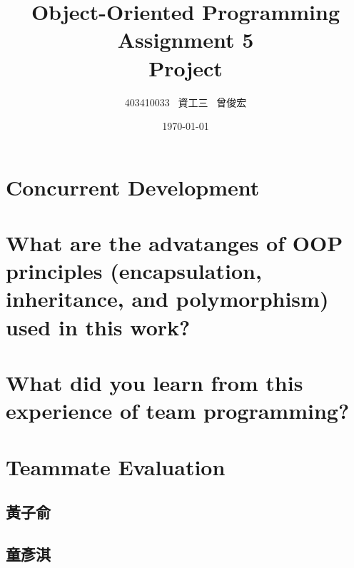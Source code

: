\documentclass[12pt, A4]{article}
\title{Object-Oriented Programming\\ Assignment 5\\ Project}
\author{403410033 \ 資工三 \ 曾俊宏}
\date{\today}
\begin{document}
	
	\maketitle
	\newpage

    \section{Concurrent Development}
    
    \section{What are the advatanges of OOP principles (encapsulation, inheritance, and polymorphism) used in this work?}
    
    \section{What did you learn from this experience of team programming?}
    
    \section{Teammate Evaluation}
    
    \subsection{黃子俞}
    
    \subsection{童彥淇}
	
\end{document}
